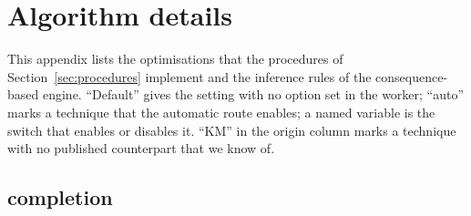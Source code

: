 \section{Algorithm details}
\label{app:algorithms}

This appendix lists the optimisations that the procedures of
Section~\ref{sec:procedures} implement and the inference rules of the
consequence-based engine.  ``Default'' gives the setting with no option set in
the worker; ``auto'' marks a technique that the automatic route enables; a
named variable is the switch that enables or disables it.  ``KM'' in the origin
column marks a technique with no published counterpart that we know of.

\subsection{\EL{} completion}

